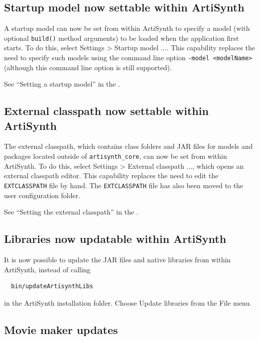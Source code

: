 \documentclass{article}
\begin{document}
\subsection*{Startup model now settable within ArtiSynth}

A startup model can now be set from within ArtiSynth to specify a
model (with optional {\tt build()} method arguments) to be loaded when
the application first starts. To do this, select {\sf Settings >
Startup model ...}. This capability replaces the need to specify such
models using the command line option {\tt -model <modelName>}
(although this command line option is still supported).

See ``Setting a startup model'' in the
.

\subsection*{External classpath now settable within ArtiSynth}

The external classpath, which contains class folders and JAR files for
models and packages located outside of {\tt artisynth\_core}, can now
be set from within ArtiSynth.  To do this, select {\sf Settings >
External classpath ...}, which opens an external classpath editor.
This capability replaces the need to edit the {\tt EXTCLASSPATH} file
by hand. The {\tt EXTCLASSPATH} file has also been moved to the user
configuration folder.

See ``Setting the external classpath'' in the
.

\subsection*{Libraries now updatable within ArtiSynth}

It is now possible to update the JAR files and native libraries from
within ArtiSynth, instead of calling
%
\begin{verbatim}
  bin/updateArtisynthLibs
\end{verbatim}
%
in the ArtiSynth installation folder.  Choose {\sf Update libraries}
from the {\sf File} menu.

\subsection*{Movie maker updates}
\end{document}
